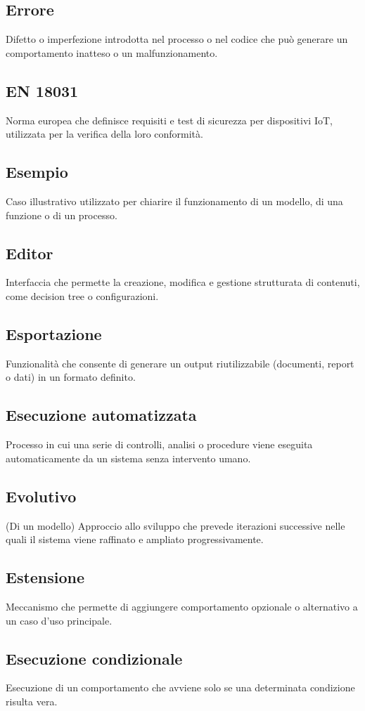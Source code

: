 \documentclass[a4paper,12pt]{article}
\begin{document}
          \subsection*{Errore}
			Difetto o imperfezione introdotta nel processo o nel codice che può generare un comportamento inatteso o un malfunzionamento.
          \subsection*{EN 18031}
			Norma europea che definisce requisiti e test di sicurezza per dispositivi IoT, utilizzata per la verifica della loro conformità.
          \subsection*{Esempio}
			Caso illustrativo utilizzato per chiarire il funzionamento di un modello, di una funzione o di un processo.
          \subsection*{Editor}
			Interfaccia che permette la creazione, modifica e gestione strutturata di contenuti, come decision tree o configurazioni.
          \subsection*{Esportazione}
			Funzionalità che consente di generare un output riutilizzabile (documenti, report o dati) in un formato definito.
          \subsection*{Esecuzione automatizzata}
			Processo in cui una serie di controlli, analisi o procedure viene eseguita automaticamente da un sistema senza intervento umano.
          \subsection*{Evolutivo}
			(Di un modello) Approccio allo sviluppo che prevede iterazioni successive nelle quali il sistema viene raffinato e ampliato progressivamente.
          \subsection*{Estensione}
			Meccanismo che permette di aggiungere comportamento opzionale o alternativo a un caso d'uso principale.
          \subsection*{Esecuzione condizionale}
			Esecuzione di un comportamento che avviene solo se una determinata condizione risulta vera.
\end{document}
